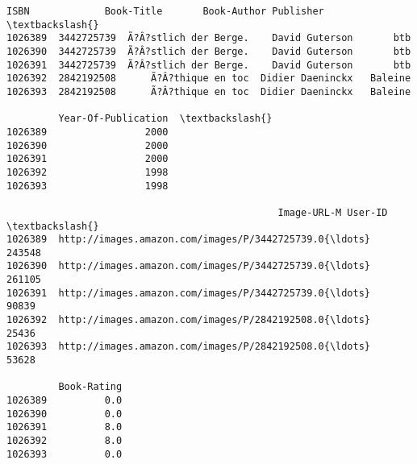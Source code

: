 \documentclass[11pt]{article}
\makeatletter
\newcommand{\boxspacing}{\kern\kvtcb@left@rule\kern\kvtcb@boxsep}
\newcommand{\prompt}[4]{
        {\ttfamily\llap{{\color{#2}[#3]:\hspace{3pt}#4}}\vspace{-\baselineskip}}
    }
\makeatother
\begin{document}
            \begin{tcolorbox}[breakable, size=fbox, boxrule=.5pt, pad at break*=1mm, opacityfill=0]
\prompt{Out}{outcolor}{57}{\boxspacing}
\begin{Verbatim}[commandchars=\\\{\}]
               ISBN             Book-Title       Book-Author Publisher  \textbackslash{}
1026389  3442725739  Ã?Â?stlich der Berge.    David Guterson       btb
1026390  3442725739  Ã?Â?stlich der Berge.    David Guterson       btb
1026391  3442725739  Ã?Â?stlich der Berge.    David Guterson       btb
1026392  2842192508      Ã?Â?thique en toc  Didier Daeninckx   Baleine
1026393  2842192508      Ã?Â?thique en toc  Didier Daeninckx   Baleine

         Year-Of-Publication  \textbackslash{}
1026389                 2000
1026390                 2000
1026391                 2000
1026392                 1998
1026393                 1998

                                               Image-URL-M User-ID  \textbackslash{}
1026389  http://images.amazon.com/images/P/3442725739.0{\ldots}  243548
1026390  http://images.amazon.com/images/P/3442725739.0{\ldots}  261105
1026391  http://images.amazon.com/images/P/3442725739.0{\ldots}   90839
1026392  http://images.amazon.com/images/P/2842192508.0{\ldots}   25436
1026393  http://images.amazon.com/images/P/2842192508.0{\ldots}   53628

         Book-Rating
1026389          0.0
1026390          0.0
1026391          8.0
1026392          8.0
1026393          0.0
\end{Verbatim}
\end{tcolorbox}
        
\end{document}
